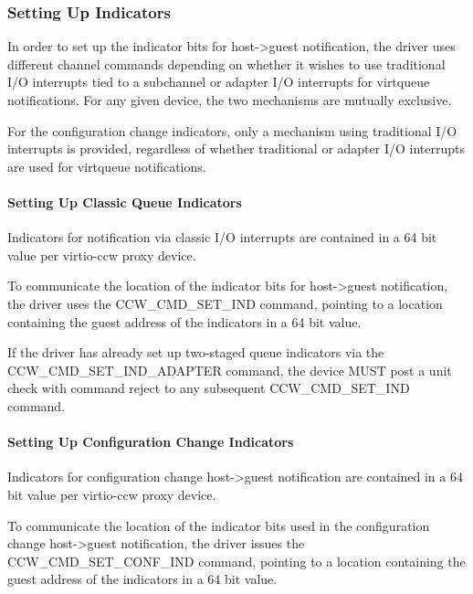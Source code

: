 \subsubsection{Setting Up Indicators}\label{sec:Virtio Transport Options / Virtio over channel I/O / Device Initialization / Setting Up Indicators}

In order to set up the indicator bits for host->guest notification,
the driver uses different channel commands depending on whether it
wishes to use traditional I/O interrupts tied to a subchannel or
adapter I/O interrupts for virtqueue notifications. For any given
device, the two mechanisms are mutually exclusive.

For the configuration change indicators, only a mechanism using
traditional I/O interrupts is provided, regardless of whether
traditional or adapter I/O interrupts are used for virtqueue
notifications.

\paragraph{Setting Up Classic Queue Indicators}\label{sec:Virtio Transport Options / Virtio over channel I/O / Device Initialization / Setting Up Indicators / Setting Up Classic Queue Indicators}

Indicators for notification via classic I/O interrupts are contained
in a 64 bit value per virtio-ccw proxy device.

To communicate the location of the indicator bits for host->guest
notification, the driver uses the CCW_CMD_SET_IND command,
pointing to a location containing the guest address of the
indicators in a 64 bit value.

If the driver has already set up two-staged queue indicators via the
CCW_CMD_SET_IND_ADAPTER command, the device MUST post a unit check
with command reject to any subsequent CCW_CMD_SET_IND command.

\paragraph{Setting Up Configuration Change Indicators}\label{sec:Virtio Transport Options / Virtio over channel I/O / Device Initialization / Setting Up Indicators / Setting Up Configuration Change Indicators}

Indicators for configuration change host->guest notification are
contained in a 64 bit value per virtio-ccw proxy device.

To communicate the location of the indicator bits used in the
configuration change host->guest notification, the driver issues the
CCW_CMD_SET_CONF_IND command, pointing to a location containing the
guest address of the indicators in a 64 bit value.


